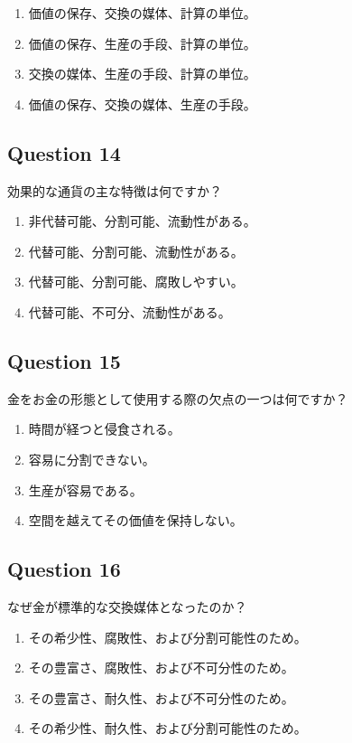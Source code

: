 \documentclass[12pt,a4paper]{article}
\begin{document}
\begin{enumerate}[label=\Alph*., leftmargin=*]
\item 価値の保存、交換の媒体、計算の単位。
\item 価値の保存、生産の手段、計算の単位。
\item 交換の媒体、生産の手段、計算の単位。
\item 価値の保存、交換の媒体、生産の手段。
\end{enumerate}

\bigskip


\subsection*{Question 14}
効果的な通貨の主な特徴は何ですか？

\begin{enumerate}[label=\Alph*., leftmargin=*]
\item 非代替可能、分割可能、流動性がある。
\item 代替可能、分割可能、流動性がある。
\item 代替可能、分割可能、腐敗しやすい。
\item 代替可能、不可分、流動性がある。
\end{enumerate}

\bigskip


\subsection*{Question 15}
金をお金の形態として使用する際の欠点の一つは何ですか？

\begin{enumerate}[label=\Alph*., leftmargin=*]
\item 時間が経つと侵食される。
\item 容易に分割できない。
\item 生産が容易である。
\item 空間を越えてその価値を保持しない。
\end{enumerate}

\bigskip


\subsection*{Question 16}
なぜ金が標準的な交換媒体となったのか？

\begin{enumerate}[label=\Alph*., leftmargin=*]
\item その希少性、腐敗性、および分割可能性のため。
\item その豊富さ、腐敗性、および不可分性のため。
\item その豊富さ、耐久性、および不可分性のため。
\item その希少性、耐久性、および分割可能性のため。
\end{enumerate}
\end{document}
